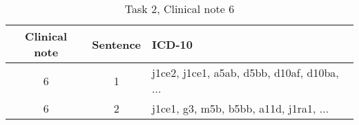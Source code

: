 \begin{table}[htbp] \footnotesize \center
\caption{Task 2, Clinical note 6 \label{tab:t2c6}}
\begin{tabularx}{\textwidth}{c c X}
    \toprule
    Clinical note & Sentence & ICD-10 \\
    \midrule
	 6 & 1 & j1ce2, j1ce1, a5ab, d5bb, d10af, d10ba, ... \\
	 6 & 2 & j1ce1, g3, m5b, b5bb, a11d, j1ra1, ... \\
	\bottomrule
\end{tabularx}
\end{table}